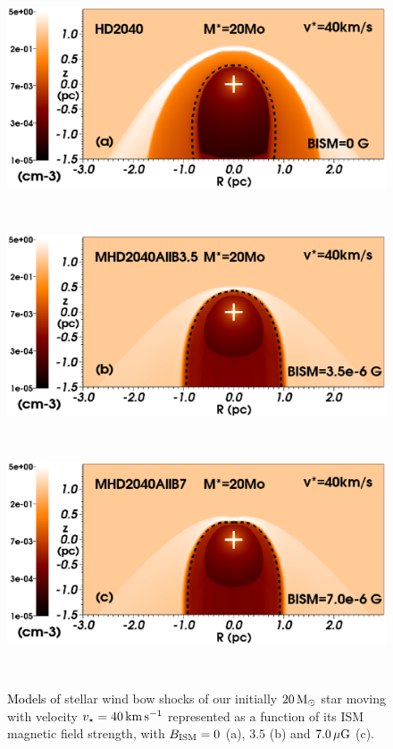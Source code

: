 \documentclass[useAMS,usenatbib]{mn2e}
\begin{document}
\begin{figure}
	\begin{minipage}[b]{ 0.48\textwidth}
		\includegraphics[width=1.0\textwidth]{./streamlines_map_20_Mo_40kms_MS_hdall_B0_legend.eps}
	\end{minipage} \\
	\begin{minipage}[b]{ 0.48\textwidth}
		\includegraphics[width=1.0\textwidth]{./streamlines_map_20_Mo_40kms_MS_mhdall_Blow_B3.5_legend.eps}
	\end{minipage} \\
	\begin{minipage}[b]{ 0.48\textwidth}
		\includegraphics[width=1.0\textwidth]{./streamlines_map_20_Mo_40kms_MS_mhdall_B7_legend.eps}
	\end{minipage} \\  	
	\caption{
		\textcolor{black}{Models of} stellar wind bow shocks of our initially $20\, \rm
M_{\odot}$ star moving with velocity $v_{\star}=40\, \rm km\, \rm s^{-1}$ represented as a function of its ISM 
magnetic field strength, with $B_{\rm ISM}=0$ (a), $3.5$ (b) and $7.0\, \rm \mu G$ (c).  
		 }
	\label{fig:bfieldstrength}  
\end{figure}
\end{document}
